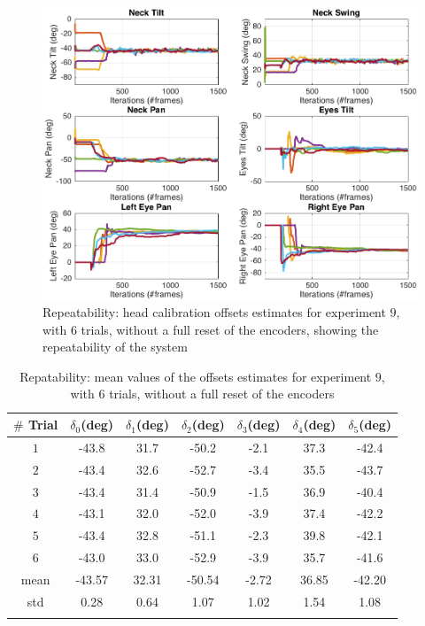 \begin{figure}
 \includegraphics[width=0.975\columnwidth]{images/results/repeatability_all}
\caption{Repeatability: head calibration offsets estimates for experiment $9$, with $6$ trials, without a full reset of the encoders, showing the repeatability of the system}
\label{fig:offsets_repeatability}
\end{figure}

\begin{table}
\centering
\begin{tabular}{ccccccc}
 \hline
 $\#$ Trial & $\delta_0$(deg) & $\delta_1$(deg) & $\delta_2$(deg) & $\delta_3$(deg) & $\delta_4$(deg) & $\delta_5$(deg) \\
 \hline
$1$ & -43.8 & 31.7 & -50.2 & -2.1 & 37.3 & -42.4 \\
$2$ & -43.4 & 32.6 & -52.7 & -3.4 & 35.5 & -43.7 \\
$3$ & -43.4 & 31.4 & -50.9 & -1.5 & 36.9 & -40.4 \\
$4$ & -43.1 & 32.0 & -52.0 & -3.9 & 37.4 & -42.2 \\
$5$ & -43.4 & 32.8 & -51.1 & -2.3 & 39.8 & -42.1 \\
$6$ & -43.0 & 33.0 & -52.9 & -3.9 & 35.7 & -41.6 \\
 \hline
mean & -43.57 &  32.31 & -50.54 & -2.72 & 36.85 & -42.20 \\
std & 0.28 & 0.64 & 1.07 & 1.02 & 1.54 & 1.08 \\
 \hline \\
\end{tabular}
\caption{Repatability: mean values of the offsets estimates for experiment $9$, with $6$ trials, without a full reset of the encoders}
\label{tab:offsets_repeatability}
\end{table}

